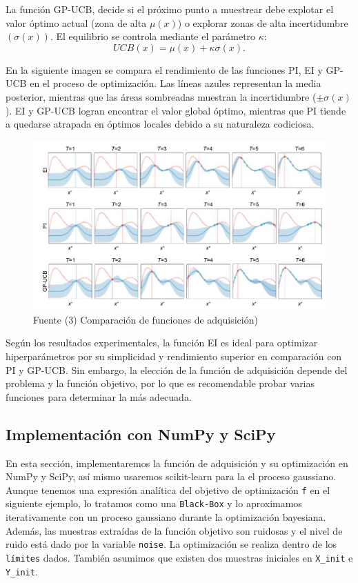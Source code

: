 \documentclass[
  12pt,
  letterpaper,
  DIV=11,
  numbers=noendperiod]{scrartcl}
\begin{document}
La función GP-UCB, decide si el próximo punto a muestrear debe explotar
el valor óptimo actual (zona de alta \(\mu(x)\)) o explorar zonas de
alta incertidumbre \((\sigma(x))\). El equilibrio se controla mediante
el parámetro \(\kappa\): \[
UCB(x) = \mu(x) + \kappa \sigma(x).
\]

En la siguiente imagen se compara el rendimiento de las funciones PI, EI
y GP-UCB en el proceso de optimización. Las líneas azules representan la
media posterior, mientras que las áreas sombreadas muestran la
incertidumbre (\(\pm \sigma(x)\)). EI y GP-UCB logran encontrar el valor
global óptimo, mientras que PI tiende a quedarse atrapada en óptimos
locales debido a su naturaleza codiciosa.

\begin{figure}[H]

{\centering \includegraphics{imgs/image.png}

}

\caption{Fuente (3) Comparación de funciones de adquisición)}

\end{figure}%

Según los resultados experimentales, la función EI es ideal para
optimizar hiperparámetros por su simplicidad y rendimiento superior en
comparación con PI y GP-UCB. Sin embargo, la elección de la función de
adquisición depende del problema y la función objetivo, por lo que es
recomendable probar varias funciones para determinar la más adecuada.

\subsection{Implementación con NumPy y
SciPy}\label{implementaciuxf3n-con-numpy-y-scipy}

En esta sección, implementaremos la función de adquisición y su
optimización en NumPy y SciPy, así mismo usaremos scikit-learn para la
el proceso gaussiano. Aunque tenemos una expresión analítica del
objetivo de optimización \texttt{f} en el siguiente ejemplo, lo tratamos
como una \texttt{Black-Box} y lo aproximamos iterativamente con un
proceso gaussiano durante la optimización bayesiana. Además, las
muestras extraídas de la función objetivo son ruidosas y el nivel de
ruido está dado por la variable \texttt{noise}. La optimización se
realiza dentro de los \texttt{límites} dados. También asumimos que
existen dos muestras iniciales en \texttt{X\_init} e \texttt{Y\_init}.
\end{document}
